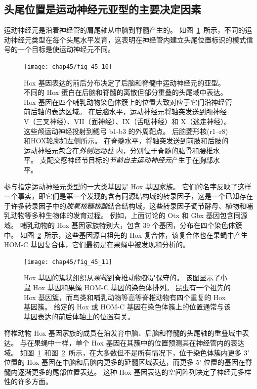 \subsection{头尾位置是运动神经元亚型的主要决定因素}

运动神经元是沿着神经管的肩尾轴从中脑到脊髓产生的。
如图~\ref{fig:45_10}~所示，不同的运动神经元类型在每个头尾水平发育，这表明在神经管内建立头尾位置标识的模式信号的一个目标是使运动神经元不同。


\begin{figure}[htbp]
	\centering
	\texttt{[image: chap45/fig\_45\_10]}
	\caption{Hox 基因表达的前后分布决定了后脑和脊髓中运动神经元的亚型。
		不同的 Hox 蛋白在后脑和脊髓的离散但部分重叠的头尾域中表达。
		Hox 基因在四个哺乳动物染色体簇上的位置大致对应于它们沿神经管前后轴的表达区域。
		在后脑水平，运动神经元将轴突发送到颅神经 V（三叉神经）、VII（面神经）、IX（舌咽神经）和 X（迷走神经）。
		这些颅运动神经投射到鳃弓 b1-b3 的外周靶点。
		后脑菱形核(r1–r8)和HOX轮廓如左侧所示。
		在脊髓水平，将轴突发送到前肢和后肢的运动神经元包含在\textit{外侧运动柱} 内，分别位于脊髓的肱骨和腰椎水平。
		支配交感神经节目标的\textit{节前自主运动神经元}产生于在胸部水平\cite{kiecker2005compartments}。 }
	\label{fig:45_10}
\end{figure}


参与指定运动神经元类型的一大类基因是 Hox 基因家族。
它们的名字反映了这样一个事实，即它们是第一个发现的含有同源结构域的转录因子，这是一个已知存在于许多转录因子中的\textit{脱氧核糖核酸}结合结构域，这些转录因子调节酵母、植物和哺乳动物等多种生物体的发育过程。
例如，上面讨论的 Otx 和 Gbx 基因包含同源域。
哺乳动物的 Hox 基因家族特别大，包含 39 个基因，分布在四个染色体簇中。
如图~\ref{fig:45_11}~所示，这些基因源自祖先的 Hox 复合体，该复合体也在果蝇中产生 HOM-C 基因复合体，它们最初是在果蝇中被发现和分析的。


\begin{figure}[htbp]
	\centering
	\texttt{[image: chap45/fig\_45\_11]}
	\caption{Hox 基因的簇状组织从\textit{果蝇}到脊椎动物都是保守的。
		该图显示了小鼠 Hox 基因和果蝇 HOM-C 基因的染色体排列。
		昆虫有一个祖先的 Hox 基因簇，而鸟类和哺乳动物等高等脊椎动物有四个重复的 Hox 基因簇。
		给定的 Hox 或 HOM-C 基因在染色体簇上的位置通常与该基因表达的前后体轴上的位置有关\cite{wolpert2015principles}。 }
	\label{fig:45_11}
\end{figure}


脊椎动物 Hox 基因家族的成员在沿发育中脑、后脑和脊髓的头尾轴的重叠域中表达。
与在果蝇中一样，单个 Hox 基因在其簇中的位置预测其在神经管内的表达域。
如图~\ref{fig:45_10}~和图~\ref{fig:45_11}~所示，在大多数但不是所有情况下，位于染色体簇内更多 3' 位置的 Hox 基因在中脑和后脑内更多的延髓区域表达，而更多 5' 位置的基因在脊髓内逐渐更多的尾部位置表达。
这种 Hox 基因表达的空间阵列决定了神经元多样性的许多方面。


